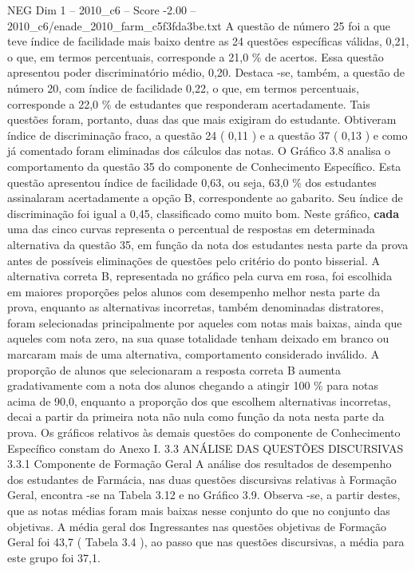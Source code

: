 \begin{textsample}{NEG Dim 1 – 2010\_c6 – Score -2.00 – 2010\_c6/enade\_2010\_farm\_c5f3fda3be.txt}
A questão de número 25 foi a que teve índice de facilidade mais baixo dentre as 24 questões específicas válidas, 0,21, o que, em termos percentuais, corresponde a 21,0 \% de acertos.
Essa questão apresentou poder discriminatório médio, 0,20.
Destaca -se, também, a questão de número 20, com índice de facilidade 0,22, o que, em termos percentuais, corresponde a 22,0 \% de estudantes que responderam acertadamente.
Tais questões foram, portanto, duas das que mais exigiram do estudante.
Obtiveram índice de discriminação fraco, a questão 24 ( 0,11 ) e a questão 37 ( 0,13 ) e como já comentado foram eliminadas dos cálculos das notas.
O Gráfico 3.8 analisa o comportamento da questão 35 do componente de Conhecimento Específico.
Esta questão apresentou índice de facilidade 0,63, ou seja, 63,0 \% dos estudantes assinalaram acertadamente a opção B, correspondente ao gabarito.
Seu índice de discriminação foi igual a 0,45, classificado como muito bom.
Neste gráfico, \textbf{cada} uma das cinco curvas representa o percentual de respostas em determinada alternativa da questão 35, em função da nota dos estudantes nesta parte da prova antes de possíveis eliminações de questões pelo critério do ponto bisserial.
A alternativa correta B, representada no gráfico pela curva em rosa, foi escolhida em maiores proporções pelos alunos com desempenho melhor nesta parte da prova, enquanto as alternativas incorretas, também denominadas distratores, foram selecionadas principalmente por aqueles com notas mais baixas, ainda que aqueles com nota zero, na sua quase totalidade tenham deixado em branco ou marcaram mais de uma alternativa, comportamento considerado inválido.
A proporção de alunos que selecionaram a resposta correta B aumenta gradativamente com a nota dos alunos chegando a atingir 100 \% para notas acima de 90,0, enquanto a proporção dos que escolhem alternativas incorretas, decai a partir da primeira nota não nula como função da nota nesta parte da prova.
Os gráficos relativos às demais questões do componente de Conhecimento Específico constam do Anexo I. 3.3 ANÁLISE DAS QUESTÕES DISCURSIVAS 3.3.1 Componente de Formação Geral A análise dos resultados de desempenho dos estudantes de Farmácia, nas duas questões discursivas relativas à Formação Geral, encontra -se na Tabela 3.12 e no Gráfico 3.9.
Observa -se, a partir destes, que as notas médias foram mais baixas nesse conjunto do que no conjunto das objetivas.
A média geral dos Ingressantes nas questões objetivas de Formação Geral foi 43,7 ( Tabela 3.4 ), ao passo que nas questões discursivas, a média para este grupo foi 37,1.

\end{textsample}
